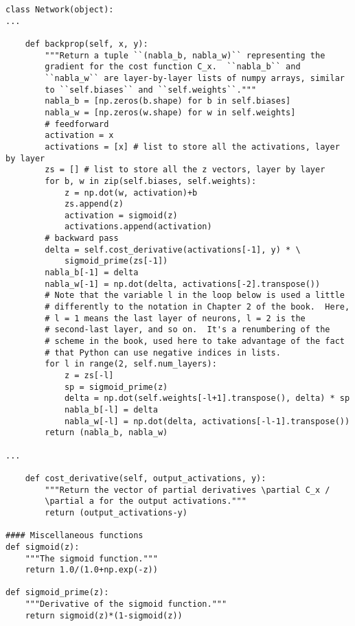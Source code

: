 \begin{fullwidth}
\begin{lstlisting}
class Network(object):
...

    def backprop(self, x, y):
        """Return a tuple ``(nabla_b, nabla_w)`` representing the
        gradient for the cost function C_x.  ``nabla_b`` and
        ``nabla_w`` are layer-by-layer lists of numpy arrays, similar
        to ``self.biases`` and ``self.weights``."""
        nabla_b = [np.zeros(b.shape) for b in self.biases]
        nabla_w = [np.zeros(w.shape) for w in self.weights]
        # feedforward
        activation = x
        activations = [x] # list to store all the activations, layer by layer
        zs = [] # list to store all the z vectors, layer by layer
        for b, w in zip(self.biases, self.weights):
            z = np.dot(w, activation)+b
            zs.append(z)
            activation = sigmoid(z)
            activations.append(activation)
        # backward pass
        delta = self.cost_derivative(activations[-1], y) * \
            sigmoid_prime(zs[-1])
        nabla_b[-1] = delta
        nabla_w[-1] = np.dot(delta, activations[-2].transpose())
        # Note that the variable l in the loop below is used a little
        # differently to the notation in Chapter 2 of the book.  Here,
        # l = 1 means the last layer of neurons, l = 2 is the
        # second-last layer, and so on.  It's a renumbering of the
        # scheme in the book, used here to take advantage of the fact
        # that Python can use negative indices in lists.
        for l in range(2, self.num_layers):
            z = zs[-l]
            sp = sigmoid_prime(z)
            delta = np.dot(self.weights[-l+1].transpose(), delta) * sp
            nabla_b[-l] = delta
            nabla_w[-l] = np.dot(delta, activations[-l-1].transpose())
        return (nabla_b, nabla_w)

...

    def cost_derivative(self, output_activations, y):
        """Return the vector of partial derivatives \partial C_x /
        \partial a for the output activations."""
        return (output_activations-y)

#### Miscellaneous functions
def sigmoid(z):
    """The sigmoid function."""
    return 1.0/(1.0+np.exp(-z))

def sigmoid_prime(z):
    """Derivative of the sigmoid function."""
    return sigmoid(z)*(1-sigmoid(z))

\end{lstlisting}
\end{fullwidth}

